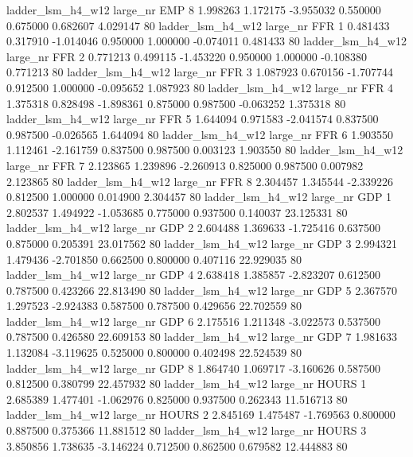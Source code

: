   ladder_lsm_h4_w12   large_nr      EMP                 8  1.998263  1.172175  -3.955032 0.550000 0.675000  0.682607    4.029147 80
  ladder_lsm_h4_w12   large_nr      FFR                 1  0.481433  0.317910  -1.014046 0.950000 1.000000 -0.074011    0.481433 80
  ladder_lsm_h4_w12   large_nr      FFR                 2  0.771213  0.499115  -1.453220 0.950000 1.000000 -0.108380    0.771213 80
  ladder_lsm_h4_w12   large_nr      FFR                 3  1.087923  0.670156  -1.707744 0.912500 1.000000 -0.095652    1.087923 80
  ladder_lsm_h4_w12   large_nr      FFR                 4  1.375318  0.828498  -1.898361 0.875000 0.987500 -0.063252    1.375318 80
  ladder_lsm_h4_w12   large_nr      FFR                 5  1.644094  0.971583  -2.041574 0.837500 0.987500 -0.026565    1.644094 80
  ladder_lsm_h4_w12   large_nr      FFR                 6  1.903550  1.112461  -2.161759 0.837500 0.987500  0.003123    1.903550 80
  ladder_lsm_h4_w12   large_nr      FFR                 7  2.123865  1.239896  -2.260913 0.825000 0.987500  0.007982    2.123865 80
  ladder_lsm_h4_w12   large_nr      FFR                 8  2.304457  1.345544  -2.339226 0.812500 1.000000  0.014900    2.304457 80
  ladder_lsm_h4_w12   large_nr      GDP                 1  2.802537  1.494922  -1.053685 0.775000 0.937500  0.140037   23.125331 80
  ladder_lsm_h4_w12   large_nr      GDP                 2  2.604488  1.369633  -1.725416 0.637500 0.875000  0.205391   23.017562 80
  ladder_lsm_h4_w12   large_nr      GDP                 3  2.994321  1.479436  -2.701850 0.662500 0.800000  0.407116   22.929035 80
  ladder_lsm_h4_w12   large_nr      GDP                 4  2.638418  1.385857  -2.823207 0.612500 0.787500  0.423266   22.813490 80
  ladder_lsm_h4_w12   large_nr      GDP                 5  2.367570  1.297523  -2.924383 0.587500 0.787500  0.429656   22.702559 80
  ladder_lsm_h4_w12   large_nr      GDP                 6  2.175516  1.211348  -3.022573 0.537500 0.787500  0.426580   22.609153 80
  ladder_lsm_h4_w12   large_nr      GDP                 7  1.981633  1.132084  -3.119625 0.525000 0.800000  0.402498   22.524539 80
  ladder_lsm_h4_w12   large_nr      GDP                 8  1.864740  1.069717  -3.160626 0.587500 0.812500  0.380799   22.457932 80
  ladder_lsm_h4_w12   large_nr    HOURS                 1  2.685389  1.477401  -1.062976 0.825000 0.937500  0.262343   11.516713 80
  ladder_lsm_h4_w12   large_nr    HOURS                 2  2.845169  1.475487  -1.769563 0.800000 0.887500  0.375366   11.881512 80
  ladder_lsm_h4_w12   large_nr    HOURS                 3  3.850856  1.738635  -3.146224 0.712500 0.862500  0.679582   12.444883 80
